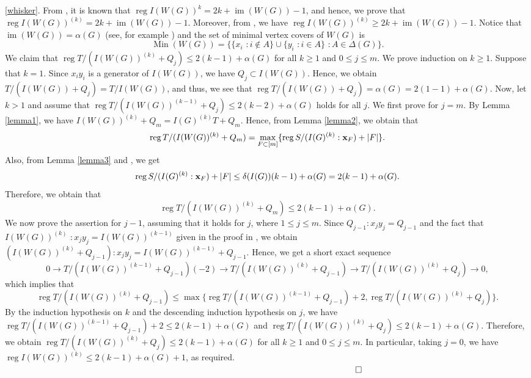\documentclass[12pt]{amsart}
\theoremstyle{definition}
\theoremstyle{remark}
\DeclareMathOperator{\reg}{reg}
\DeclareMathOperator{\im}{im}
\DeclareMathOperator{\Min}{Min}
\begin{document}
\vspace{0.5cm}
\ref{whisker}. 
From \cite[Corollary 5.4 (5)]{js2021}, it is known that $\reg I(W(G))^{k}=2k+\im(W(G))-1$, and hence, we prove that $\reg I(W(G))^{(k)}=2k+\im(W(G))-1$. Moreover, from \cite[Theorem 4.6]{ghrs2020}, we have $\reg I(W(G))^{(k)}\geq2k+\im(W(G))-1$. Notice that $\im(W(G))=\alpha(G)$ (see, for example \cite[Corollary 4.4]{mpt2025}) and the set of minimal vertex covers of $W(G)$ is $$\Min(W(G))=\{\{x_{i}\,\,: i\notin A\}\cup\{y_{i}\,\,: i\in A\}\,\,: A\in\Delta(G)\}.$$We claim that $\reg T/(I(W(G))^{(k)}+Q_{j})\leq2(k-1)+\alpha(G)$ for all $k\geq1$ and $0\leq j\leq m$. We prove induction on $k\geq1$. Suppose that $k=1$. Since $x_{i}y_{i}$ is a generator of $I(W(G))$, we have $Q_{j}\subset I(W(G))$. Hence, we obtain $T/(I(W(G))+Q_{j})=T/I(W(G))$, and thus, we see that $\reg T/(I(W(G))+Q_{j})=\alpha(G)=2(1-1)+\alpha(G)$. Now, let $k>1$ and assume that $\reg T/(I(W(G))^{(k-1)}+Q_{j})\leq2(k-2)+\alpha(G)$ holds for all $j$. We first prove for $j=m$. By Lemma \ref{lemma1}, we have $I(W(G))^{(k)}+Q_{m}=I(G)^{(k)}T+Q_{m}$. Hence, from Lemma \ref{lemma2}, we obtain that 
$$\reg T/(I(W(G))^{(k)}+Q_{m})=\max_{F\subset[m]}\{\reg S/(I(G)^{(k)}:{\bf x}_{F})+|F|\}.$$
Also, from Lemma \ref{lemma3} and \cite[Example 4.4]{dhnt2021}, we get $$\reg S/(I(G)^{(k)}:{\bf x}_{F})+|F|\leq\delta(I(G))(k-1)+\alpha(G)=2(k-1)+\alpha(G).$$
Therefore, we obtain that 
$$\reg T/(I(W(G))^{(k)}+Q_{m})\leq 2(k-1)+\alpha(G).$$
We now prove the assertion for $j-1$, assuming that it holds for $j$, where $1\leq j\leq m$. 
Since $Q_{j-1}:x_{j}y_{j}=Q_{j-1}$ and the fact that $I(W(G))^{(k)}\,\,: x_{j}y_{j}=I(W(G))^{(k-1)}$ given in the proof in \cite[Theorem 5.2]{kty2018}, we obtain 
$(I(W(G))^{(k)}+Q_{j-1}):x_{j}y_{j}=I(W(G))^{(k-1)}+Q_{j-1}$. Hence, we get a short exact sequence 
$$0\rightarrow T/(I(W(G))^{(k-1)}+Q_{j-1})(-2)\rightarrow T/(I(W(G))^{(k)}+Q_{j-1})\rightarrow T/(I(W(G))^{(k)}+Q_{j})\rightarrow0,$$
which implies that $$\reg T/(I(W(G))^{(k)}+Q_{j-1})\leq\max\{\reg T/(I(W(G))^{(k-1)}+Q_{j-1})+2, \reg T/(I(W(G))^{(k)}+Q_{j})\}.$$
By the induction hypothesis on $k$ and the descending induction hypothesis on $j$, we have $\reg T/(I(W(G))^{(k-1)}+Q_{j-1})+2\leq2(k-1)+\alpha(G)$ and $\reg T/(I(W(G))^{(k)}+Q_{j})\leq 2(k-1)+\alpha(G)$. Therefore, we obtain $\reg T/(I(W(G))^{(k)}+Q_{j})\leq 2(k-1)+\alpha(G)$ for all $k\geq1$ and $0\leq j\leq m$. In particular, taking $j=0$, we have $\reg I(W(G))^{(k)}\leq 2(k-1)+\alpha(G)+1$, as required. 
$\hspace{14.4cm}\square$
\end{document}
